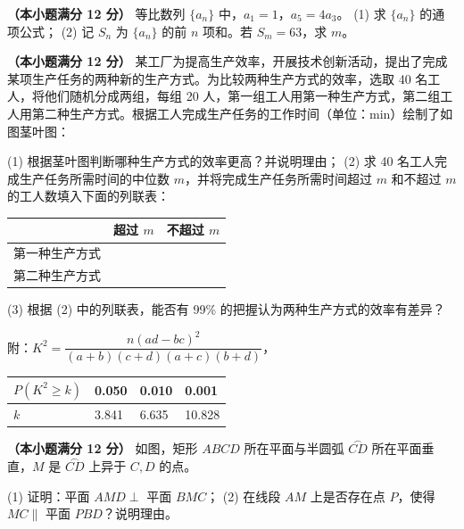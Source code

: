 \begin{question}
\textbf{（本小题满分 12 分）} 
等比数列 $\{a_n\}$ 中，$a_1 = 1$，$a_5 = 4a_3$。
(1) 求 $\{a_n\}$ 的通项公式；
(2) 记 $S_n$ 为 $\{a_n\}$ 的前 $n$ 项和。若 $S_m = 63$，求 $m$。

\Needspace{0.4\textheight}
\end{question}
\begin{question}
\textbf{（本小题满分 12 分）} 
某工厂为提高生产效率，开展技术创新活动，提出了完成某项生产任务的两种新的生产方式。为比较两种生产方式的效率，选取 40 名工人，将他们随机分成两组，每组 20 人，第一组工人用第一种生产方式，第二组工人用第二种生产方式。根据工人完成生产任务的工作时间（单位：min）绘制了如图茎叶图：
\nopagebreak[4]
\begin{center}\end{center}
\nopagebreak[4]
(1) 根据茎叶图判断哪种生产方式的效率更高？并说明理由；
(2) 求 40 名工人完成生产任务所需时间的中位数 $m$，并将完成生产任务所需时间超过 $m$ 和不超过 $m$ 的工人数填入下面的列联表：

\begin{center}
\begin{tabular}{lll}
\toprule
 & 超过 $m$ & 不超过 $m$ \\
\midrule
第一种生产方式 &  &  \\
第二种生产方式 &  &  \\
\bottomrule
\end{tabular}
\end{center}

(3) 根据 (2) 中的列联表，能否有 99\% 的把握认为两种生产方式的效率有差异？

附：$K^2 = \dfrac{n(ad - bc)^2}{(a + b)(c + d)(a + c)(b + d)}$，

\begin{center}
\begin{tabular}{llll}
\toprule
$P(K^2 \geqslant k)$ & 0.050 & 0.010 & 0.001 \\
\midrule
$k$ & 3.841 & 6.635 & 10.828 \\
\bottomrule
\end{tabular}
\end{center}

\Needspace{0.4\textheight}
\end{question}
\begin{question}
\textbf{（本小题满分 12 分）} 
如图，矩形 $ABCD$ 所在平面与半圆弧 $\overset{\frown}{CD}$ 所在平面垂直，$M$ 是 $\overset{\frown}{CD}$ 上异于 $C, D$ 的点。
\nopagebreak[4]
\begin{center}\end{center}
\nopagebreak[4]
(1) 证明：平面 $AMD \perp$ 平面 $BMC$；
(2) 在线段 $AM$ 上是否存在点 $P$，使得 $MC \parallel$ 平面 $PBD$？说明理由。

\end{question}
